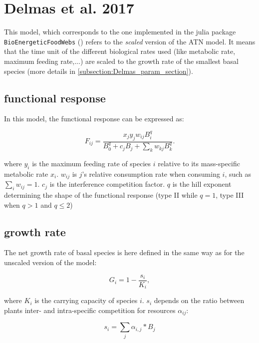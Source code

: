 \documentclass[12pt,a4paper]{article}
\begin{document}
\section{Delmas et al. 2017}
\label{section:delmas}

This model, which corresponds to the one implemented in the julia package \texttt{BioEnergeticFoodWebs} (\cite{delmas2017simulations}) refers to the \textit{scaled} version of the ATN model. It means that the time unit of the different biological rates used (like metabolic rate, maximum feeding rate,...) are scaled to the growth rate of the smallest basal species (more details in \ref{subsection:Delmas_param_section}).   

\subsection{functional response}

In this model, the functional response can be expressed as: 

\begin{equation}
F_{ij} = \frac{x_jy_jw_{ij}B_i^q}{B_0^q + c_jB_j + \sum_kw_{kj}B_k^q}.
\end{equation}

where $y_i$ is the maximum feeding rate of species $i$ relative to its mass-specific metabolic rate $x_i$. $w_{ij}$ is $j$'s relative consumption rate when consuming $i$, such as $\sum_iw_{ij} = 1$. $c_j$ is the interference competition factor. $q$ is the hill exponent determining the shape of the functional response (type II while $q = 1$, type III when $q > 1$ and $q\leq2$)

\subsection{growth rate}

The net growth rate of basal species is here defined in the same way as for the unscaled version of the model:

\begin{equation}
G_i = 1 - \frac{s_i}{K_i},
\end{equation}

where $K_i$ is the carrying capacity of species $i$. $s_i$ depends on the ratio between plants inter- and intra-specific competition for resources $\alpha_{ij}$:

\begin{equation}
s_i = \sum_j \alpha_{i,j}*B_j
\end{equation}
\end{document}
